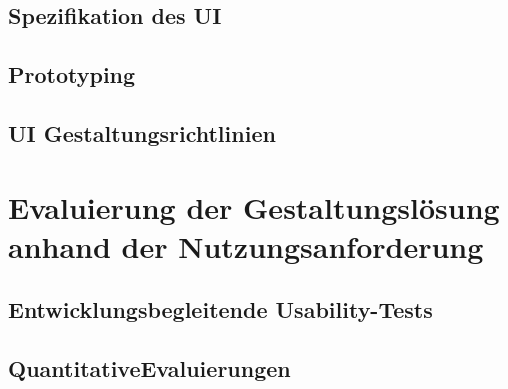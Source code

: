\documentclass[12pt, a4paper]{scrartcl}
\begin{document}
	\subsection{Spezifikation des UI}
	\blindtext[1]
	\subsection{Prototyping}
	\blindtext[1]
	\subsection{UI Gestaltungsrichtlinien}
	\blindtext[1]
	
	\newpage
	
	\section{Evaluierung der Gestaltungslösung anhand der Nutzungsanforderung}
	\blindtext[2]
	\subsection{Entwicklungsbegleitende Usability-Tests}
	\blindtext[1]
	\subsection{QuantitativeEvaluierungen}
	\blindtext[1]
	
	
	
\end{document}
